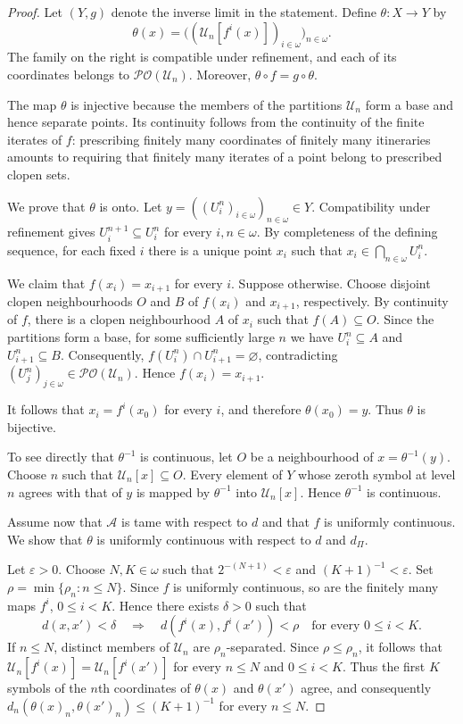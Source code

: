 \documentclass[12pt]{amsart}
\theoremstyle{definition}
\numberwithin{equation}{section}
\theoremstyle{remark}
\begin{document}
\begin{proof}
Let $(Y,g)$ denote the inverse limit in the statement. Define
$\theta:X\to Y$ by
\[
\theta(x)
=
\bigl((\mathcal U_n[f^i(x)])_{i\in\omega}\bigr)_{n\in\omega}.
\]
The family on the right is compatible under refinement, and each of its
coordinates belongs to $\mathcal{PO}(\mathcal U_n)$. Moreover,
$\theta\circ f=g\circ\theta$.

The map $\theta$ is injective because the members of the partitions
$\mathcal U_n$ form a base and hence separate points. Its continuity follows
from the continuity of the finite iterates of $f$: prescribing finitely many
coordinates of finitely many itineraries amounts to requiring that finitely
many iterates of a point belong to prescribed clopen sets.

We prove that $\theta$ is onto. Let
$y=((U_i^n)_{i\in\omega})_{n\in\omega}\in Y$. Compatibility under refinement
gives $U_i^{n+1}\subseteq U_i^n$ for every $i,n\in\omega$. By completeness
of the defining sequence, for each fixed $i$ there is a unique point $x_i$
such that
$x_i\in\bigcap_{n\in\omega}U_i^n$.

We claim that $f(x_i)=x_{i+1}$ for every $i$. Suppose otherwise. Choose
disjoint clopen neighbourhoods $O$ and $B$ of $f(x_i)$ and $x_{i+1}$,
respectively. By continuity of $f$, there is a clopen neighbourhood $A$ of
$x_i$ such that $f(A)\subseteq O$. Since the partitions form a base, for
some sufficiently large $n$ we have $U_i^n\subseteq A$ and
$U_{i+1}^n\subseteq B$. Consequently,
$f(U_i^n)\cap U_{i+1}^n=\varnothing$, contradicting
$(U_j^n)_{j\in\omega}\in\mathcal{PO}(\mathcal U_n)$. Hence
$f(x_i)=x_{i+1}$.

It follows that $x_i=f^i(x_0)$ for every $i$, and therefore
$\theta(x_0)=y$. Thus $\theta$ is bijective.

To see directly that $\theta^{-1}$ is continuous, let $O$ be a neighbourhood
of $x=\theta^{-1}(y)$. Choose $n$ such that
$\mathcal U_n[x]\subseteq O$. Every element of $Y$ whose zeroth symbol at
level $n$ agrees with that of $y$ is mapped by $\theta^{-1}$ into
$\mathcal U_n[x]$. Hence $\theta^{-1}$ is continuous.

Assume now that $\mathcal A$ is tame with respect to $d$ and that $f$ is
uniformly continuous. We show that $\theta$ is uniformly continuous with
respect to $d$ and $d_{\Pi}$.

Let $\varepsilon>0$. Choose $N,K\in\omega$ such that
$2^{-(N+1)}<\varepsilon$ and $(K+1)^{-1}<\varepsilon$. Set
$\rho=\min\{\rho_n:n\leq N\}$. Since $f$ is uniformly continuous, so are
the finitely many maps $f^i$, $0\leq i<K$. Hence there exists $\delta>0$
such that
\[
d(x,x')<\delta
\quad\Longrightarrow\quad
d(f^i(x),f^i(x'))<\rho
\quad\text{for every }0\leq i<K.
\]
If $n\leq N$, distinct members of $\mathcal U_n$ are
$\rho_n$-separated. Since $\rho\leq\rho_n$, it follows that
$\mathcal U_n[f^i(x)]=\mathcal U_n[f^i(x')]$ for every $n\leq N$ and
$0\leq i<K$. Thus the first $K$ symbols of the $n$th coordinates of
$\theta(x)$ and $\theta(x')$ agree, and consequently
$d_n(\theta(x)_n,\theta(x')_n)\leq(K+1)^{-1}$ for every $n\leq N$.


\end{proof}
\end{document}
